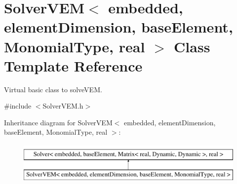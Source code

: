 \hypertarget{class_solver_v_e_m}{\section{\-Solver\-V\-E\-M$<$ embedded, element\-Dimension, base\-Element, \-Monomial\-Type, real $>$ \-Class \-Template \-Reference}
\label{class_solver_v_e_m}
}


\-Virtual basic class to solve\-V\-E\-M.  




{\ttfamily \#include $<$\-Solver\-V\-E\-M.\-h$>$}

\-Inheritance diagram for \-Solver\-V\-E\-M$<$ embedded, element\-Dimension, base\-Element, \-Monomial\-Type, real $>$\-:\begin{figure}[H]
\begin{center}
\leavevmode
\includegraphics[height=2.000000cm]{class_solver_v_e_m}
\end{center}
\end{figure}
